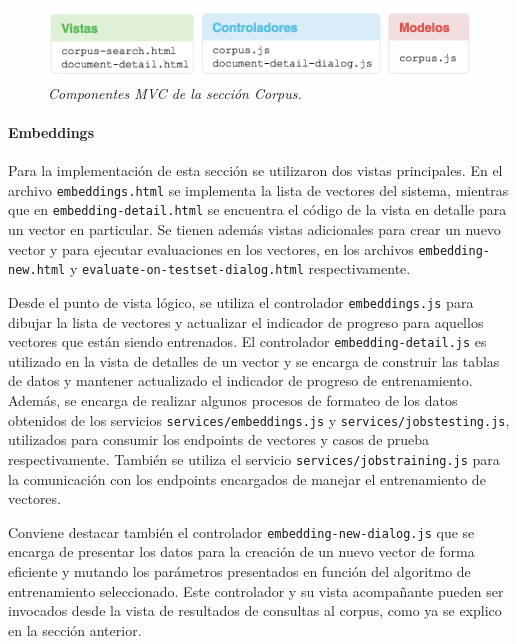 \begin{figure}[h]
    \centering
    \includegraphics[width=\textwidth]{images/ui-nabu-mvc-corpus}
    \caption{\textit{Componentes MVC de la sección Corpus.}}
    \label{fig:ui-nabu-mvc-corpus}
\end{figure}

\paragraph{Embeddings}

Para la implementación de esta sección se utilizaron dos vistas principales. En el archivo
\texttt{embeddings.html} se implementa la lista de vectores del sistema, mientras que en
\texttt{embedding-detail.html} se encuentra el código de la vista en detalle para un vector en particular.
Se tienen además vistas adicionales para crear un nuevo vector y para ejecutar evaluaciones en los vectores,
en los archivos \texttt{embedding-new.html} y \texttt{evaluate-on-testset-dialog.html} respectivamente.

Desde el punto de vista lógico, se utiliza el controlador \texttt{embeddings.js} para dibujar la lista de
vectores  y actualizar el indicador de progreso para aquellos vectores que están siendo entrenados. El
controlador \texttt{embedding-detail.js} es utilizado en la vista de detalles de un vector y se encarga de
construir las tablas de datos y mantener actualizado el indicador de progreso de entrenamiento. Además, se
encarga de realizar algunos procesos de formateo de los datos obtenidos de los servicios
\texttt{services/embeddings.js} y \texttt{services/jobstesting.js}, utilizados para consumir los endpoints
de vectores y casos de prueba respectivamente. También se utiliza el servicio
\texttt{services/jobstraining.js} para la comunicación con los endpoints encargados de manejar el
entrenamiento de vectores.

Conviene destacar también el controlador \texttt{embedding-new-dialog.js} que se encarga de presentar los
datos para la creación de un nuevo vector de forma eficiente y mutando los parámetros presentados en función
del algoritmo de entrenamiento seleccionado. Este controlador y su vista acompañante pueden ser invocados
desde la vista de resultados de consultas al corpus, como ya se explico en la sección anterior.

